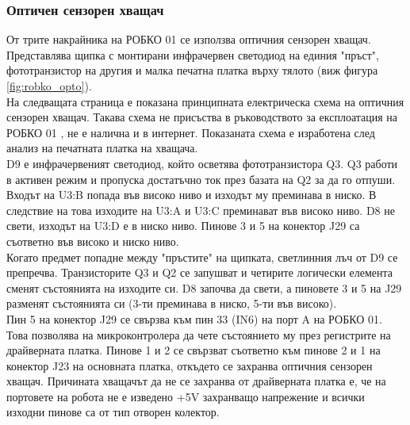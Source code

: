 \subsubsection{Оптичен сензорен хващач}
\label{opto_claw_section}
\indent{}
От трите накрайника на РОБКО 01 се използва оптичния сензорен хващач. Представлява щипка с монтирани инфрачервен светодиод на единия "пръст", фототранзистор на другия и малка печатна платка върху тялото (виж фигура \ref{fig:robko_opto}).\\
\indent{}
На следващата страница е показана принципната електрическа схема на оптичния сензорен хващач. Такава схема не присъства в ръководството за експлоатация на РОБКО 01
\cite{robko-man}, не е налична и в интернет. Показаната схема е изработена след анализ на печатната платка на хващача.\\
\indent{}
D9 е инфрачервеният светодиод, който осветява фототранзистора Q3. Q3 работи в активен режим и пропуска достатъчно ток през базата на Q2 за да го отпуши. Входът на U3:B попада във високо ниво и изходът му преминава в ниско. В следствие на това изходите на U3:A и U3:C преминават във високо ниво. D8 не свети, изходът на U3:D е в ниско ниво. Пинове 3 и 5 на конектор J29 са съответно във високо и ниско ниво.\\
\indent{}
Когато предмет попадне между "пръстите" на щипката, светлинния лъч от D9 се препречва. Транзисторите Q3 и Q2 се запушват и четирите логически елемента сменят състоянията на изходите си. D8 започва да свети, а пиновете 3 и 5 на J29 разменят състоянията си (3-ти преминава в ниско, 5-ти във високо).\\
\indent{}
Пин 5 на конектор J29 се свързва към пин 33 (IN6) на порт A на РОБКО 01. Това позволява на микроконтролера да чете състоянието му през регистрите на драйверната платка. Пинове 1 и 2 се свързват съответно към пинове 2 и 1 на конектор J23 на основната платка, откъдето се захранва оптичния сензорен хващач. Причината хващачът да не се захранва от драйверната платка е, че на портовете на робота не е изведено +5V захранващо напрежение и всички изходни пинове са от тип отворен колектор.

